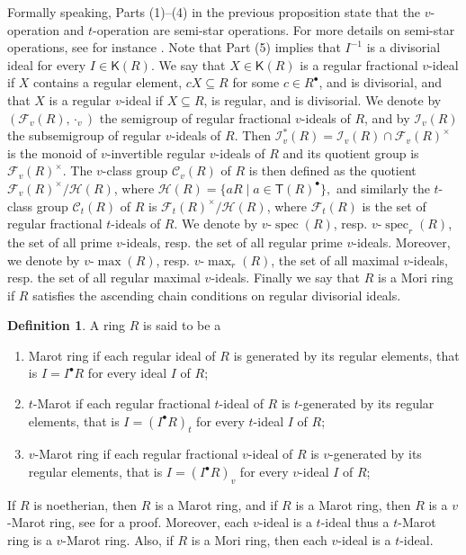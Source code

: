 \documentclass[a4paper, 10pt]{amsart}
\newcommand{\defit}[1]{{\textsf{#1}}}
\theoremstyle{plain}
\theoremstyle{definition}
\newtheorem{definition}[theorem]{Definition}
\theoremstyle{remark}
\DeclareMathOperator{\spec}{spec}
\numberwithin{equation}{section}
\begin{document}
Formally speaking, Parts (1)--(4) in the previous proposition state that the $v$-operation and $t$-operation are semi-star operations. For more details on semi-star operations, see for instance \cite{El19}. Note that Part (5) implies that $I^{-1}$ is a divisorial ideal for every $I\in \mathsf K(R).$ 
We say that $X\in \mathsf{K}(R)$ is a \defit{regular fractional $v$-ideal} if $X$ contains a regular element, $cX\subseteq R$ for some $c\in R^\bullet$, and is divisorial, and that $X$ is a \defit{regular $v$-ideal} if $X\subseteq R$, is regular, and is divisorial. We denote by $(\mathcal{F}_v(R), \cdot_v)$ the semigroup of regular fractional $v$-ideals of $R$, and by $\mathcal I_v(R)$ the subsemigroup of regular $v$-ideals of $R$. Then $\mathcal I^{\ast} _v(R) = \mathcal I_v(R) \cap \mathcal F_v(R)^{\times}$ is the monoid of $v$-invertible regular $v$-ideals of $R$ and its quotient group is $\mathcal F_v(R)^{\times}$. The $v$-\defit{class group} $\mathcal{C}_v(R)$ of $R$ is then defined as the quotient $\mathcal{F}_v(R)^\times/\mathcal{H}(R)$, where $\mathcal{H}(R)=\{aR\mid a\in \mathsf{T}(R)^\bullet\},$ and similarly the $t$-\defit{class group}  $\mathcal{C}_t(R)$ of $R$ is $\mathcal{F}_t(R)^\times/\mathcal{H}(R)$, where $\mathcal{F}_t(R)$ is the set of regular fractional $t$-ideals of $R$.
We denote by $v$-$\spec(R)$, resp. $v$-$\spec_r(R)$, the set of all prime $v$-ideals, resp. the set of all regular prime $v$-ideals. Moreover, we denote by $v$-$\max(R)$, resp. $v$-$\max_r(R)$, the set of all maximal $v$-ideals, resp. the set of all regular maximal $v$-ideals. Finally we say that $R$ is a \defit{Mori} ring if $R$ satisfies the ascending chain conditions on regular divisorial ideals.

\begin{definition} A ring $R$ is said to be a
\begin{enumerate}
    \item \defit{Marot ring} if each regular ideal of $R$ is generated by its regular elements, that is $I=I^\bullet R$ for every ideal $I$ of $R$;
    \item  \defit{$t$-Marot} if each regular fractional $t$-ideal of $R$ is $t$-generated by its regular elements,  that is $I=(I^\bullet R)_t$ for every $t$-ideal $I$ of $R$;
    \item  \defit{$v$-Marot ring} if each regular fractional $v$-ideal of $R$ is $v$-generated by its regular elements,  that is $I=(I^\bullet R)_v$ for every $v$-ideal $I$ of $R$;
\end{enumerate}
\end{definition}
If $R$ is noetherian, then $R$ is a Marot ring, and if $R$ is a Marot ring, then $R$ is a $v$-Marot ring, see \cite[Proposition 3.3]{GRR15} for a proof. Moreover, each $v$-ideal is a $t$-ideal thus a $t$-Marot ring is a $v$-Marot ring. Also, if $R$ is a Mori ring, then each $v$-ideal is a $t$-ideal.
\end{document}
